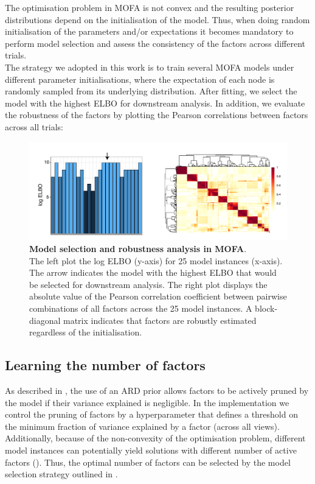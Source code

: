 The optimisation problem in MOFA is not convex and the resulting posterior distributions depend on the initialisation of the model. Thus, when doing random initialisation of the parameters and/or expectations it becomes mandatory to perform model selection and assess the consistency of the factors across different trials.\\
The strategy we adopted in this work is to train several MOFA models under different parameter initialisations, where the expectation of each node is randomly sampled from its underlying distribution. After fitting, we select the model with the highest ELBO for downstream analysis. In addition, we evaluate the robustness of the factors by plotting the Pearson correlations between factors across all trials:

\begin{figure}[H]
	\centering 	
	\includegraphics[width=1.0\textwidth]{MOFA_robustness}
	\caption{ \textbf{Model selection and robustness analysis in MOFA}.\\
	The left plot the log ELBO (y-axis) for 25 model instances (x-axis). The arrow indicates the model with the highest ELBO that would be selected for downstream analysis. The right plot displays the absolute value of the Pearson correlation coefficient between pairwise combinations of all factors across the 25 model instances. A block-diagonal matrix indicates that factors are robustly estimated regardless of the initialisation.}
	\label{fig:MOFA_robustness}
\end{figure}


\subsection{Learning the number of factors} \label{section:mofa_nfactors}

As described in , the use of an ARD prior allows factors to be actively pruned by the model if their variance explained is negligible. In the implementation we control the pruning of factors by a hyperparameter that defines a threshold on the minimum fraction of variance explained by a factor (across all views).\\
Additionally, because of the non-convexity of the optimisation problem, different model instances can potentially yield solutions with different number of active factors (). Thus, the optimal number of factors can be selected by the model selection strategy outlined in .

